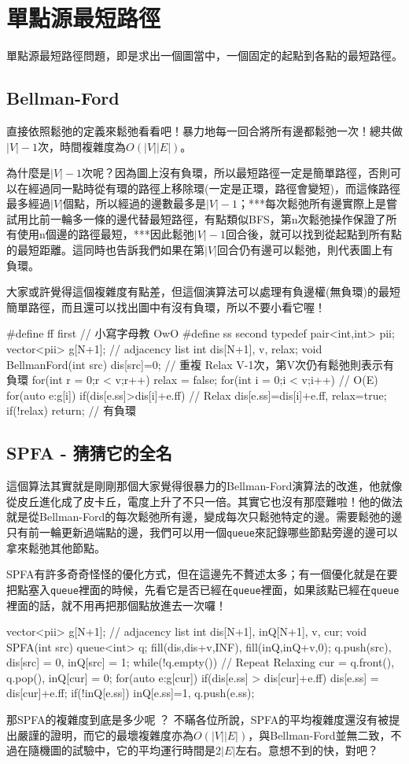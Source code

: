 \section{單點源最短路徑}
單點源最短路徑問題，即是求出一個圖當中，一個固定的起點到各點的最短路徑。
\subsection{Bellman-Ford}
直接依照鬆弛的定義來鬆弛看看吧！暴力地每一回合將所有邊都鬆弛一次！總共做$|V|-1$次，時間複雜度為$O(|V||E|)$。

為什麼是$|V|-1$次呢？因為圖上沒有負環，所以最短路徑一定是簡單路徑，否則可以在經過同一點時從有環的路徑上移除環(一定是正環，路徑會變短)，而這條路徑最多經過$|V|$個點，所以經過的邊數最多是$|V|-1$；***每次鬆弛所有邊實際上是嘗試用比前一輪多一條的邊代替最短路徑，有點類似BFS，第n次鬆弛操作保證了所有使用n個邊的路徑最短，***因此鬆弛$|V|-1$回合後，就可以找到從起點到所有點的最短距離。這同時也告訴我們如果在第$|V|$回合仍有邊可以鬆弛，則代表圖上有負環。

大家或許覺得這個複雜度有點差，但這個演算法可以處理有負邊權(無負環)的最短簡單路徑，而且還可以找出圖中有沒有負環，所以不要小看它喔！ 
\begin{C++}
#define ff first // 小寫字母教 OwO
#define ss second
typedef pair<int,int> pii;
vector<pii> g[N+1]; // adjacency list
int dis[N+1], v, relax;
void BellmanFord(int src){
	dis[src]=0;
	// 重複 Relax V-1次，第V次仍有鬆弛則表示有負環
	for(int r = 0;r < v;r++){
		relax = false;
		for(int i = 0;i < v;i++) // O(E)
			for(auto e:g[i])
				if(dis[e.ss]>dis[i]+e.ff) // Relax
					dis[e.ss]=dis[i]+e.ff, relax=true;
		if(!relax) return;
	}
	// 有負環
}
\end{C++}

\subsection{SPFA - 猜猜它的全名}
這個算法其實就是剛剛那個大家覺得很暴力的Bellman-Ford演算法的改進，他就像從皮丘進化成了皮卡丘，電度上升了不只一倍。其實它也沒有那麼難啦！他的做法就是從Bellman-Ford的每次鬆弛所有邊，變成每次只鬆弛特定的邊。需要鬆弛的邊只有前一輪更新過端點的邊，我們可以用一個\texttt{queue}來記錄哪些節點旁邊的邊可以拿來鬆弛其他節點。

SPFA有許多奇奇怪怪的優化方式，但在這邊先不贅述太多；有一個優化就是在要把點塞入\texttt{queue}裡面的時候，先看它是否已經在\texttt{queue}裡面，如果該點已經在\texttt{queue}裡面的話，就不用再把那個點放進去一次囉！
\begin{C++}
vector<pii> g[N+1]; // adjacency list
int dis[N+1], inQ[N+1], v, cur;
void SPFA(int src){
	queue<int> q;
	fill(dis,dis+v,INF), fill(inQ,inQ+v,0);
	q.push(src), dis[src] = 0, inQ[src] = 1;
	while(!q.empty()){ // Repeat Relaxing
		cur = q.front(), q.pop(), inQ[cur] = 0;
		for(auto e:g[cur])
			if(dis[e.ss] > dis[cur]+e.ff){
				dis[e.ss] = dis[cur]+e.ff;
				if(!inQ[e.ss])
					inQ[e.ss]=1, q.push(e.ss);
			}
	}
}
\end{C++}
那SPFA的複雜度到底是多少呢 ？ 不瞞各位所說，SPFA的平均複雜度還沒有被提出嚴謹的證明，而它的最壞複雜度亦為$O(|V||E|)$，與Bellman-Ford並無二致，不過在隨機圖的試驗中，它的平均運行時間是$2|E|$左右。意想不到的快，對吧？

